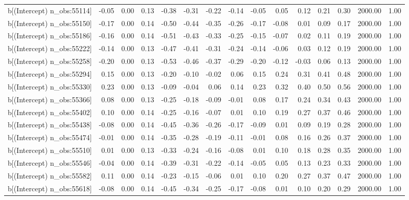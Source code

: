 \begin{table}[ht]
\begin{tabular}{rrrrrrrrrrrrrrr}
  b[(Intercept) n\_obs:55114] & -0.05 & 0.00 & 0.13 & -0.38 & -0.31 & -0.22 & -0.14 & -0.05 & 0.05 & 0.12 & 0.21 & 0.30 & 2000.00 & 1.00 \\ 
  b[(Intercept) n\_obs:55150] & -0.17 & 0.00 & 0.14 & -0.50 & -0.44 & -0.35 & -0.26 & -0.17 & -0.08 & 0.01 & 0.09 & 0.17 & 2000.00 & 1.00 \\ 
  b[(Intercept) n\_obs:55186] & -0.16 & 0.00 & 0.14 & -0.51 & -0.43 & -0.33 & -0.25 & -0.15 & -0.07 & 0.02 & 0.11 & 0.19 & 2000.00 & 1.00 \\ 
  b[(Intercept) n\_obs:55222] & -0.14 & 0.00 & 0.13 & -0.47 & -0.41 & -0.31 & -0.24 & -0.14 & -0.06 & 0.03 & 0.12 & 0.19 & 2000.00 & 1.00 \\ 
  b[(Intercept) n\_obs:55258] & -0.20 & 0.00 & 0.13 & -0.53 & -0.46 & -0.37 & -0.29 & -0.20 & -0.12 & -0.03 & 0.06 & 0.13 & 2000.00 & 1.00 \\ 
  b[(Intercept) n\_obs:55294] & 0.15 & 0.00 & 0.13 & -0.20 & -0.10 & -0.02 & 0.06 & 0.15 & 0.24 & 0.31 & 0.41 & 0.48 & 2000.00 & 1.00 \\ 
  b[(Intercept) n\_obs:55330] & 0.23 & 0.00 & 0.13 & -0.09 & -0.04 & 0.06 & 0.14 & 0.23 & 0.32 & 0.40 & 0.50 & 0.56 & 2000.00 & 1.00 \\ 
  b[(Intercept) n\_obs:55366] & 0.08 & 0.00 & 0.13 & -0.25 & -0.18 & -0.09 & -0.01 & 0.08 & 0.17 & 0.24 & 0.34 & 0.43 & 2000.00 & 1.00 \\ 
  b[(Intercept) n\_obs:55402] & 0.10 & 0.00 & 0.14 & -0.25 & -0.16 & -0.07 & 0.01 & 0.10 & 0.19 & 0.27 & 0.37 & 0.46 & 2000.00 & 1.00 \\ 
  b[(Intercept) n\_obs:55438] & -0.08 & 0.00 & 0.14 & -0.45 & -0.36 & -0.26 & -0.17 & -0.09 & 0.01 & 0.09 & 0.19 & 0.28 & 2000.00 & 1.00 \\ 
  b[(Intercept) n\_obs:55474] & -0.01 & 0.00 & 0.14 & -0.35 & -0.28 & -0.19 & -0.11 & -0.01 & 0.08 & 0.16 & 0.26 & 0.37 & 2000.00 & 1.00 \\ 
  b[(Intercept) n\_obs:55510] & 0.01 & 0.00 & 0.13 & -0.33 & -0.24 & -0.16 & -0.08 & 0.01 & 0.10 & 0.18 & 0.28 & 0.35 & 2000.00 & 1.00 \\ 
  b[(Intercept) n\_obs:55546] & -0.04 & 0.00 & 0.14 & -0.39 & -0.31 & -0.22 & -0.14 & -0.05 & 0.05 & 0.13 & 0.23 & 0.33 & 2000.00 & 1.00 \\ 
  b[(Intercept) n\_obs:55582] & 0.11 & 0.00 & 0.14 & -0.23 & -0.15 & -0.06 & 0.01 & 0.10 & 0.20 & 0.27 & 0.37 & 0.47 & 2000.00 & 1.00 \\ 
  b[(Intercept) n\_obs:55618] & -0.08 & 0.00 & 0.14 & -0.45 & -0.34 & -0.25 & -0.17 & -0.08 & 0.01 & 0.10 & 0.20 & 0.29 & 2000.00 & 1.00 \\ 

\end{tabular}
\end{table}
